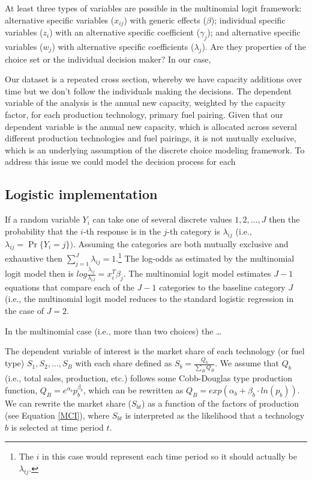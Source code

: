\documentclass[10pt]{amsart}
\begin{document}
At least three types of variables are possible in the multinomial logit framework: alternative specific variables ($x_{ij}$) with generic effects ($\beta$); individual specific variables ($z_i$) with an alternative specific coefficient ($\gamma_j$); and alternative specific variables ($w_j$) with alternative specific coefficients ($\lambda_j$)\parencite{mlogit2013}.  
Are they properties of the choice set or the individual decision maker?
In our case, 

Our dataset is a repeated cross section, whereby we have capacity additions over time but we don't follow the individuals making the decisions. 
The dependent variable of the analysis is the annual new capacity, weighted by the capacity factor, for each production technology, primary fuel pairing. 
Given that our dependent variable is the annual new capacity, which is allocated across several different production technologies and fuel pairings, it is not mutually exclusive, which is an underlying assumption of the discrete choice modeling framework.
To address this issue we could model the decision process for each 

\subsection{Logistic implementation}
If a random variable $Y_{i}$ can take one of several discrete values $1, 2, \ldots, J$ then the probability that the $i$-th response is in the $j$-th category is $\lambda_{ij}$ (i.e., $\lambda_{ij} = \Pr\{Y_{i} = j\})$. 
Assuming the categories are both mutually exclusive and exhaustive then $\sum_{j=1}^J \lambda_{ij} = 1$.\footnote{The $i$ in this case would represent each time period so it should actually be $\lambda_{tj}$.} 
The log-odds as estimated by the multinomial logit model then is $log \frac{\lambda_{ij}}{\lambda_{iJ}} = x_{i}^T \beta_j$.
The multinomial logit model estimates $J - 1$ equations that compare each of the $J - 1$ categories to the baseline category $J$ (i.e., the multinomial logit model reduces to the standard logistic regression in the case of $J=2$. 

In the multinomial case (i.e., more than two choices) the \ldots

The dependent variable of interest is the market share of each technology (or fuel type) \textit{$S_1, S_2, \ldots, S_B$} with each share defined as $S_b = \frac{Q_b}{\sum_B Q_B}$.
We assume that $Q_b$ (i.e., total sales, production, etc.) follows some Cobb-Douglas type production function, $Q_B = e^{\alpha_b}p_{b}^{\beta_b}$, which can be rewritten as $Q_B = exp\left(\alpha_b + \beta_b \cdot ln(p_b)\right)$.
We can rewrite the market share ($S_{bt}$) as a function of the factors of production (see Equation \ref{MCI}), where $S_{bt}$ is interpreted as the likelihood that a technology $b$ is selected at time period $t$.  
\end{document}
